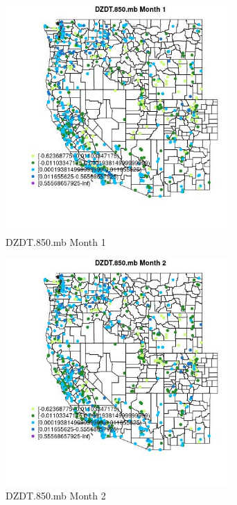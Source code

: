 \begin{figure} 
\centering  
\includegraphics[width=0.77\textwidth]{Code_Outputs/Report_ML_input_PM25_Step4_part_e_de_duplicated_aves_compiled_2019-05-21wNAs_MapObsMo1DZDT850mb.jpg} 
\caption{\label{fig:Report_ML_input_PM25_Step4_part_e_de_duplicated_aves_compiled_2019-05-21wNAsMapObsMo1DZDT850mb}DZDT.850.mb Month 1} 
\end{figure} 
 

\begin{figure} 
\centering  
\includegraphics[width=0.77\textwidth]{Code_Outputs/Report_ML_input_PM25_Step4_part_e_de_duplicated_aves_compiled_2019-05-21wNAs_MapObsMo2DZDT850mb.jpg} 
\caption{\label{fig:Report_ML_input_PM25_Step4_part_e_de_duplicated_aves_compiled_2019-05-21wNAsMapObsMo2DZDT850mb}DZDT.850.mb Month 2} 
\end{figure} 
 

